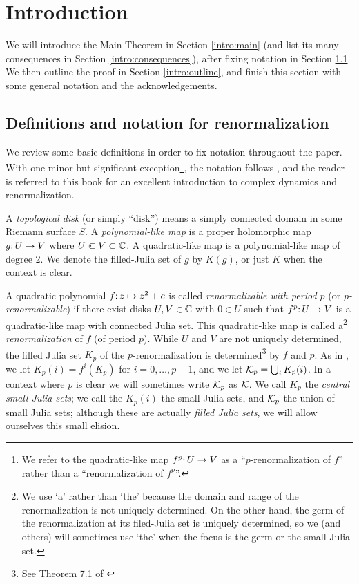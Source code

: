 \newcommand{\smallheading}[1]{\msk {\it #1.}}
\renewcommand{\smallheading}[1]{\subsubsection{#1}}


\section{Introduction} \label{sec:intro}
We will introduce the Main Theorem in Section \ref{intro:main}
(and list its many consequences in Section \ref{intro:consequences}), after fixing notation in Section \ref{intro:defs}.
We then outline the proof in Section \ref{intro:outline}, 
and finish this section with some general notation and the acknowledgements. 
\subsection{Definitions and notation for renormalization} \label{intro:defs}
We review some basic definitions in order to fix notation throughout the paper. 
With one minor but significant exception\footnote{We refer to the quadratic-like map $f^p\mathpunct: U \to V$ as a ``$p$-renormalization of $f$''
rather than a ``renormalization of $f^p$''.}, 
the notation follows \cite{McM},
and the reader is referred to this book for an excellent introduction to complex dynamics and renormalization.

A  {\it topological disk} (or simply ``disk'') means a simply connected  domain in some Riemann surface $S$.
A \emph{polynomial-like map} is a proper holomorphic map $g\mathpunct: U \to V$ where $U \Subset V \subset {\Bbb C}$.
A quadratic-like map is a polynomial-like map of degree 2.
We denote the filled-Julia set of $g$ by $K(g)$, or just $K$ when the context is clear. 

A quadratic polynomial  $f\mathpunct: z\mapsto z^2+c$
is called {\it renormalizable with period $p$}
(or \emph{$p$-renormalizable})
if there exist disks $U, V \in {\Bbb C}$ with $0 \in U$ such that $f^p\mathpunct: U\to V$
is a quadratic-like map with connected Julia set.
This quadratic-like map is called a\footnote{We use `a' rather than `the' because the domain and range of the renormalization is not uniquely determined. 
On the other hand, the germ of the renormalization at its filed-Julia set is uniquely determined, 
so we (and others) will sometimes use `the' when the focus is the germ or the small Julia set. } 
{\it renormalization} of $f$ (of period $p$).
While $U$ and $V$ are not uniquely determined,
the filled Julia set $K_p$ of the $p$-renormalization is determined\footnote{See Theorem 7.1 of \cite{McM}} 
by $f$ and $p$. 
As in \cite{McM},
we let $K_p(i) = f^i(K_p)$ for $i = 0, \ldots, p-1$, 
and we let ${\mathcal K}_p = \bigcup_i K_p(i)$. 
In a context where $p$ is clear we will sometimes write ${\mathcal K}_p$ as ${\mathcal K}$.
We call $K_p$ the \emph{central small Julia sets};
we call the $K_p(i)$ the small Julia sets,
and ${\mathcal K}_p$ the union of small Julia sets;
although these are actually \emph{filled Julia sets},
we will allow ourselves this small elision. 


